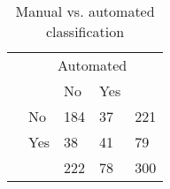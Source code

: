 \begin{table}
\begin{small}
\begin{threeparttable}
\caption{{\normalsize Manual vs. automated classification}}
\begin{tabular}{ll|ll|l}
& \multicolumn{4}{c}{Automated} \tabularnewline[0.1cm]
& & No & Yes &   \tabularnewline
\cline{2-5}
\parbox[t]{2mm}{} & No & 184 & 37 & 221 \tabularnewline
& Yes & 38 & 41 & 79 \tabularnewline
{}
&  & 222 & 78 & 300 \tabularnewline
\end{tabular}
\end{threeparttable}
\end{small}
\end{table}
